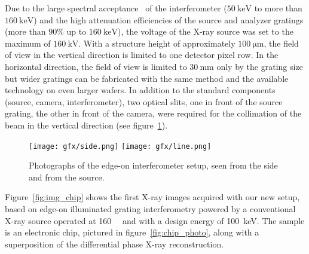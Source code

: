 Due to the large spectral acceptance~\parencite{Weitkamp2005,Thuering2013c} of the
interferometer ($\SI{50}{\kilo\electronvolt}$ to
more than $\SI{160}{\kilo\electronvolt}$) and the high attenuation efficiencies of
the source and analyzer gratings (more than $90\%$ up to
$\SI{160}{\kilo\electronvolt}$), the voltage of the X-ray source was set to
the maximum of $\SI{160}{\kilo\volt}$. With a structure height of
approximately $\SI{100}{\micro\metre}$, the field of view in the vertical
direction is limited to one detector pixel row. In the horizontal direction,
the field of view is limited to $\SI{30}{\milli\metre}$ only by the grating size but wider gratings can be fabricated with the same
method and the available technology on even larger wafers. In addition to the standard components (source,
camera, interferometer), two optical slits, one in front of the source
grating, the other in front of the camera, were required for the collimation
of the beam in the vertical direction (see figure~\ref{fig:edge.on.photos}). 

\begin{figure}[ht]
    \centering
    \texttt{[image: gfx/side.png]}
    \texttt{[image: gfx/line.png]}
    \caption{Photographs of the edge-on interferometer setup, seen
    from the side and from the source.}\label{fig:edge.on.photos}
\end{figure}

Figure~\ref{fig:img_chip} shows the first X-ray images acquired with our new setup, based on
edge-on illuminated grating interferometry powered by a conventional X-ray
source operated at \SI{160}{\kilo\voltpeak} and with a design energy of
\SI{100}{\kilo\eV}. The sample is an electronic chip, pictured in
figure~\ref{fig:chip_photo}, along with a superposition of the differential
phase X-ray reconstruction.

